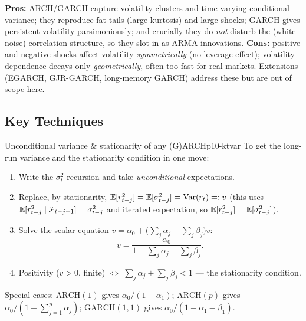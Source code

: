 \begin{intuition}
\textbf{Pros:} ARCH/GARCH capture volatility clusters and time-varying
conditional variance; they reproduce fat tails (large kurtosis) and large shocks;
GARCH gives persistent volatility parsimoniously; and crucially they do
\emph{not} disturb the (white-noise) correlation structure, so they slot in as
ARMA innovations. \textbf{Cons:} positive and negative shocks affect volatility
\emph{symmetrically} (no leverage effect); volatility dependence decays only
\emph{geometrically}, often too fast for real markets. Extensions (EGARCH,
GJR-GARCH, long-memory GARCH) address these but are out of scope here.
\end{intuition}

\subsection{Key Techniques}

\begin{keytech}{Unconditional variance \& stationarity of any (G)ARCH}{p10-ktvar}
To get the long-run variance and the stationarity condition in one move:
\begin{enumerate}
  \item Write the $\sigma_t^2$ recursion and take \emph{unconditional}
        expectations.
  \item Replace, by stationarity, $\mathbb{E}[r_{t-j}^2]=\mathbb{E}[\sigma_{t-j}^2]=\operatorname{Var}(r_t)=:v$
        (this uses $\mathbb{E}[r_{t-j}^2\mid\mathcal F_{t-j-1}]=\sigma_{t-j}^2$ and iterated
        expectation, so $\mathbb{E}[r_{t-j}^2]=\mathbb{E}[\sigma_{t-j}^2]$).
  \item Solve the scalar equation $v=\alpha_0+\big(\sum_j\alpha_j+\sum_j\beta_j\big)v$:
        \[
        v=\frac{\alpha_0}{1-\sum_j\alpha_j-\sum_j\beta_j}.
        \]
  \item Positivity ($v>0$, finite) $\Leftrightarrow$
        $\sum_j\alpha_j+\sum_j\beta_j<1$ --- the stationarity condition.
\end{enumerate}
Special cases: $\mathrm{ARCH}(1)$ gives $\alpha_0/(1-\alpha_1)$;
$\mathrm{ARCH}(p)$ gives $\alpha_0/(1-\sum_{j=1}^p\alpha_j)$;
$\mathrm{GARCH}(1,1)$ gives $\alpha_0/(1-\alpha_1-\beta_1)$.
\end{keytech}

